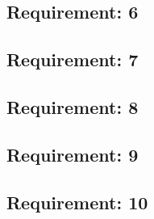 \documentclass[a4paper,twoside,11pt]{article}
\begin{document}
\begin{appendices}
	\subsection{Requirement: 6} \cbstart
	
	\cbend
	\subsection{Requirement: 7}
	
	\subsection{Requirement: 8}
	
	\subsection{Requirement: 9}
	
	\subsection{Requirement: 10}
	



\end{appendices}
\end{document}
